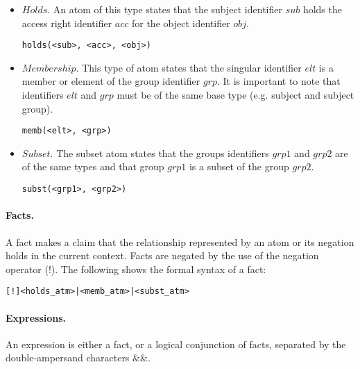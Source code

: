 \documentclass[10pt, twocolumn]{article}
\begin{document}
          \begin{itemize}
            \item
              $Holds$. An atom of this type states that the subject identifier
              $sub$ holds the access right identifier $acc$ for the object
              identifier $obj$.
         
              \begin{verbatim}holds(<sub>, <acc>, <obj>)\end{verbatim}
            \item
              $Membership$. This type of atom states that the singular
              identifier $elt$ is a member or element of the group identifier
              $grp$. It is important to note that identifiers $elt$ and $grp$
              must be of the same base type (e.g. subject and subject group).
         
              \begin{verbatim}memb(<elt>, <grp>)\end{verbatim}
            \item
              $Subset$. The subset atom states that the groups identifiers
              $grp1$ and $grp2$ are of the same types and that group $grp1$
              is a subset of the group $grp2$.

              \begin{verbatim}subst(<grp1>, <grp2>)\end{verbatim}
          \end{itemize}

        \paragraph{Facts.}
          A fact makes a claim that the relationship represented by an atom or
          its negation holds in the current context. Facts are negated by the
          use of the negation operator ($!$). The following shows the formal
          syntax of a fact:
 
          \begin{verbatim}[!]<holds_atm>|<memb_atm>|<subst_atm>\end{verbatim}
 
        \paragraph{Expressions.}
          An expression is either a fact, or a logical conjunction of facts,
          separated by the double-ampersand characters $\&\&$.
\end{document}
